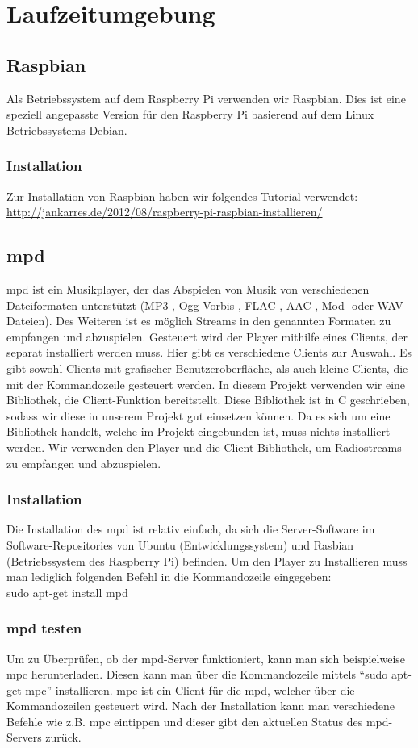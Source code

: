 \section{Laufzeitumgebung}
\subsection{Raspbian}
Als Betriebssystem auf dem Raspberry Pi verwenden wir Raspbian. Dies ist eine speziell angepasste Version für den Raspberry Pi basierend auf dem Linux Betriebssystems Debian.\\
\subsubsection{Installation}
Zur Installation von Raspbian haben wir folgendes Tutorial verwendet:\\
\url{http://jankarres.de/2012/08/raspberry-pi-raspbian-installieren/}
\subsection{mpd}
mpd ist ein Musikplayer, der das Abspielen von Musik von verschiedenen Dateiformaten unterstützt (MP3-, Ogg Vorbis-, FLAC-, AAC-, Mod- oder WAV-Dateien). Des Weiteren ist es möglich Streams in den genannten Formaten zu empfangen und abzuspielen. Gesteuert wird der Player mithilfe eines Clients, der separat installiert werden muss. Hier gibt es verschiedene Clients zur Auswahl. Es gibt sowohl Clients mit grafischer Benutzeroberfläche, als auch kleine Clients, die mit der Kommandozeile gesteuert werden. In diesem Projekt  verwenden wir eine Bibliothek, die Client-Funktion bereitstellt. Diese Bibliothek ist in C geschrieben, sodass wir diese in unserem Projekt gut einsetzen können. Da es sich um eine Bibliothek handelt, welche im Projekt eingebunden ist, muss nichts installiert werden. Wir verwenden den Player und die Client-Bibliothek, um Radiostreams zu empfangen und abzuspielen.
	
\subsubsection{Installation}
Die Installation des mpd ist relativ einfach, da sich die Server-Software im Software-Repositories von Ubuntu (Entwicklungssystem) und Rasbian (Betriebssystem des Raspberry Pi) befinden. Um den Player zu Installieren muss man lediglich folgenden Befehl in die Kommandozeile eingegeben:\\
sudo apt-get install mpd

\subsubsection{mpd testen}
Um zu Überprüfen, ob der mpd-Server funktioniert, kann man sich beispielweise mpc herunterladen. Diesen kann man über die Kommandozeile mittels "`sudo apt-get mpc"' installieren. mpc ist ein Client für die mpd, welcher über die Kommandozeilen gesteuert wird. Nach der Installation kann man verschiedene Befehle wie z.B. mpc eintippen und dieser gibt den aktuellen Status des mpd-Servers zurück.